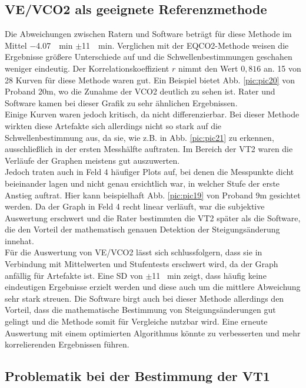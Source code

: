 \subsection{\acrshort{VE}/\acrshort{VCO2} als geeignete Referenzmethode}
%
Die Abweichungen zwischen Ratern und Software beträgt für diese Methode im Mittel \SI{-4,07}{\per\minute} $\pm$\SI{11}{\per\minute}. Verglichen mit der \gls{EQCO2}-Methode weisen die Ergebnisse größere Unterschiede auf und die Schwellenbestimmungen geschahen weniger eindeutig. Der Korrelationskoeffizient $r$ nimmt den Wert $0,816$ an. 15 von 28 Kurven für diese Methode waren gut. Ein Beispiel bietet Abb. \ref{pic:pic20} von Proband 20m, wo die Zunahme der \gls{VCO2} deutlich zu sehen ist. Rater und Software kamen bei dieser Grafik zu sehr ähnlichen Ergebnissen.\\
Einige Kurven waren jedoch kritisch, da nicht differenzierbar. Bei dieser Methode wirkten diese Artefakte sich allerdings nicht so stark auf die Schwellenbestimmung aus, da sie, wie z.B. in Abb. \ref{pic:pic21} zu erkennen, ausschließlich in der ersten Messhälfte auftraten. Im Bereich der VT2 waren die Verläufe der Graphen meistens gut auszuwerten.\\
Jedoch traten auch in Feld 4 häufiger Plots auf, bei denen die Messpunkte dicht beieinander lagen und nicht genau ersichtlich war, in welcher Stufe der erste Anstieg auftrat. Hier kann beispielhaft Abb. \ref{pic:pic19} von Proband 9m gesichtet werden. Da der Graph in Feld 4 recht linear verläuft, war die subjektive Auswertung erschwert und die Rater bestimmten die VT2 später als die Software, die den Vorteil der mathematisch genauen Detektion der Steigungsänderung innehat.\\
Für die Auswertung von \gls{VE}/\gls{VCO2} lässt sich schlussfolgern, dass sie in Verbindung mit Mittelwerten und Stufentests erschwert wird, da der Graph anfällig für Artefakte ist. Eine \gls{SD} von $\pm$11 \si{\per\minute} zeigt, dass häufig keine eindeutigen Ergebnisse erzielt werden und diese auch um die mittlere Abweichung sehr stark streuen. Die Software birgt auch bei dieser Methode allerdings den Vorteil, dass die mathematische Bestimmung von Steigungsänderungen gut gelingt und die Methode somit für Vergleiche nutzbar wird. Eine erneute Auswertung mit einem optimierten Algorithmus könnte zu verbesserten und mehr korrelierenden Ergebnissen führen.
%
\subsection{Problematik bei der Bestimmung der VT1}
%
